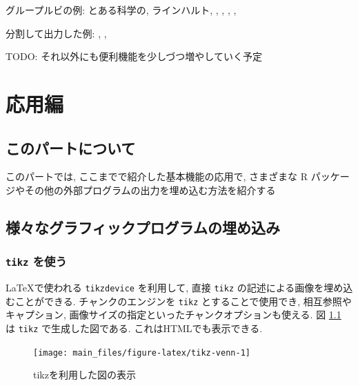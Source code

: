 \documentclass[
  nomag]{bxjsbook}
\theoremstyle{definition}
\theoremstyle{definition}
\theoremstyle{definition}
\theoremstyle{remark}
\begin{document}
グループルビの例: とある科学の,
ラインハルト,
,
,
, , 

分割して出力した例:
,
 ,

TODO: それ以外にも便利機能を少しづつ増やしていく予定

\hypertarget{part-ux5fdcux7528ux7de8}{%
\part{応用編}\label{part-ux5fdcux7528ux7de8}}

\hypertarget{ux3053ux306eux30d1ux30fcux30c8ux306bux3064ux3044ux3066}{%
\chapter*{このパートについて}\label{ux3053ux306eux30d1ux30fcux30c8ux306bux3064ux3044ux3066}}

このパートでは, ここまでで紹介した基本機能の応用で, さまざまな R
パッケージやその他の外部プログラムの出力を埋め込む方法を紹介する

\hypertarget{advanced-graph}{%
\chapter{様々なグラフィックプログラムの埋め込み}\label{advanced-graph}}

\hypertarget{tikz-ux3092ux4f7fux3046}{%
\section{\texorpdfstring{\texttt{tikz}
を使う}{tikz を使う}}\label{tikz-ux3092ux4f7fux3046}}

\LaTeX で使われる \texttt{tikzdevice} を利用して, 直接 \texttt{tikz}
の記述による画像を埋め込むことができる. チャンクのエンジンを
\texttt{tikz} とすることで使用でき, 相互参照やキャプション,
画像サイズの指定といったチャンクオプションも使える. 図
\ref{fig:tikz-venn} は \texttt{tikz} で生成した図である.
これはHTMLでも表示できる.

\begin{figure}

{\centering \texttt{[image: main\_files/figure-latex/tikz-venn-1]} 

}

\caption{tikzを利用した図の表示}\label{fig:tikz-venn}
\end{figure}
\end{document}
